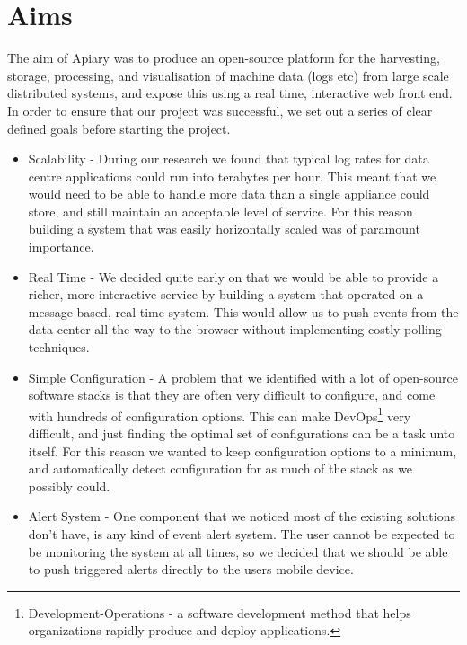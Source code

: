 \section{Aims}
The aim of Apiary was to produce an open-source platform for the harvesting,
storage, processing, and visualisation of machine data (logs etc) from large
scale distributed systems, and expose this using a real time, interactive web
front end. In order to ensure that our project was successful, we set out a
series of clear defined goals before starting the project.

\begin{itemize}

\item Scalability - During our research we found that typical log rates for data
  centre applications could run into terabytes per hour. This meant that we
  would need to be able to handle more data than a single appliance could store,
  and still maintain an acceptable level of service. For this reason building a
  system that was easily horizontally scaled was of paramount importance.

\item Real Time - We decided quite early on that we would be able to provide a
  richer, more interactive service by building a system that operated on a
  message based, real time system. This would allow us to push events from the
  data center all the way to the browser without implementing costly polling
  techniques.

\item Simple Configuration - A problem that we identified with a lot of
  open-source software stacks is that they are often very difficult to
  configure, and come with hundreds of configuration options. This can make
  DevOps\footnote{Development-Operations - a software development method that
  helps organizations rapidly produce and deploy applications.} very difficult,
  and just finding the optimal set of configurations can be a task unto itself.
  For this reason we wanted to keep configuration options
  to a minimum, and automatically detect configuration for as much of the stack
  as we possibly could.

\item Alert System - One component that we noticed most of the existing
  solutions don't have, is any kind of event alert system. The user cannot be
  expected to be monitoring the system at all times, so we decided that we
  should be able to push triggered alerts directly to the users mobile device.


\end{itemize}
